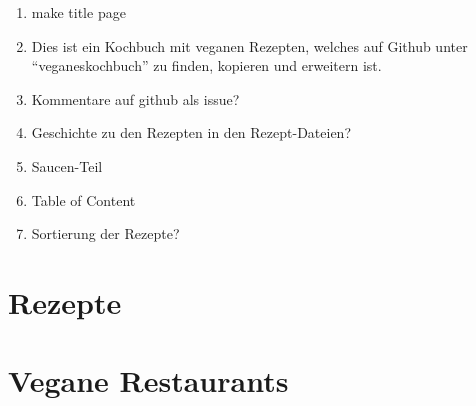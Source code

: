 \documentclass[12pt,a4paper]{article}
\begin{document}
\begin{enumerate}
	\item make title page
	\item Dies ist ein Kochbuch mit veganen Rezepten, welches auf Github unter \enquote{veganeskochbuch} zu finden, kopieren und erweitern ist.\\
	\item Kommentare auf github als issue?
	\item Geschichte zu den Rezepten in den Rezept-Dateien?
	\item Saucen-Teil
	\item Table of Content
	\item Sortierung der Rezepte?
\end{enumerate}
\clearpage
\section{Rezepte}
	
	
	
	
	
\section{Vegane Restaurants}
	
\end{document}
